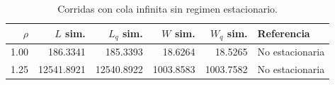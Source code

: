 \begin{table}[htbp]
\centering
\caption{Corridas con cola infinita sin regimen estacionario.}
\label{tab:mm1-infinite-unstable}
\begin{tabular}{rrrrrl}
\toprule
$\rho$ & $L$ sim. & $L_q$ sim. & $W$ sim. & $W_q$ sim. & Referencia \\
\midrule
1.00 & 186.3341 & 185.3393 & 18.6264 & 18.5265 & No estacionaria \\
1.25 & 12541.8921 & 12540.8922 & 1003.8583 & 1003.7582 & No estacionaria \\
\bottomrule
\end{tabular}
\end{table}
